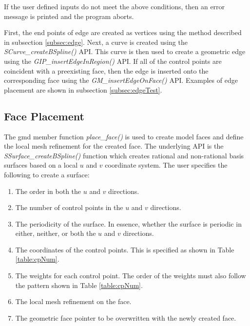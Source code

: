 \documentclass[a4paper, 12pt]{article}
\begin{document}
If the user defined inputs do not meet the above conditions, then an error 
message is printed and the program aborts.

First, the end points of edge are created as vertices using the 
method described in subsection \ref{subsec:edge}. Next, a curve
is created using the \emph{SCurve\_createBSpline()} API. This 
curve is then used to create a geometric edge using the 
\emph{GIP\_insertEdgeInRegion()} API. If all of the 
control points are coincident with a preexisting face, then the
edge is inserted onto the corresponding face using the 
\emph{GM\_insertEdgeOnFace()} API. Examples of edge placement
are shown in subsection \ref{subsec:edgeTest}.

\subsection{Face Placement} \label{subsec:face}
The gmd member function \emph{place\_face()} is used to create model 
faces and define the local mesh refinement for the created face. The
underlying API is the \emph{SSurface\_createBSpline()} function which creates 
rational and non-rational basis surfaces based on a local $u$ and $v$ 
coordinate system.  The user specifies the following to create a surface:
\begin{enumerate}
  \item The order in both the $u$ and $v$ directions.
  \item The number of control points in the $u$ and $v$ directions.
  \item The periodicity of the surface. In essence, whether the 
      surface is periodic in either, neither, or both the $u$ and $v$ directions.
  \item The coordinates of the control points. This is specified as shown in
      Table \ref{table:cpNum}.
  \item The weights for each control point. The order of the weights must
      also follow the pattern shown in Table \ref{table:cpNum}.
  \item The local mesh refinement on the face. 
  \item The geometric face pointer to be overwritten with the newly created face.
\end{enumerate}
\end{document}
